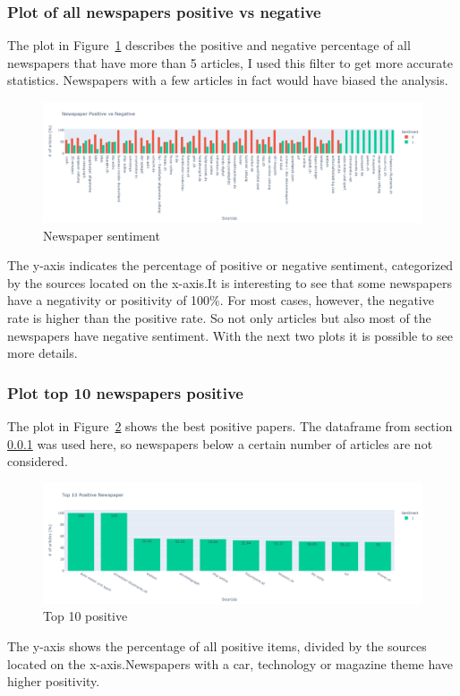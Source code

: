\subsubsection{Plot of all newspapers positive vs negative}
\label{chap:allposneg}
The \gls{plot} in Figure~\ref{fig:fig_all} describes the positive and negative percentage of all newspapers that have more than 5 articles, I used this filter to get more accurate statistics. Newspapers with a few articles in fact would have biased the analysis.
\begin{figure}[H]
\centering
\includegraphics[width=1\textwidth]{images/posvsneg1.png}
\caption{Newspaper sentiment}
\label{fig:fig_all}
\end{figure}
\FloatBarrier
The y-axis indicates the percentage of positive or negative sentiment, categorized by the sources located on the x-axis.It is interesting to see that some newspapers have a negativity or positivity of 100\%.
For most cases, however, the negative rate is higher than the positive rate.
So not only articles but also most of the newspapers have negative sentiment.
With the next two plots it is possible to see more details.

\subsubsection{Plot top 10 newspapers positive}
The \gls{plot} in Figure~\ref{fig:fig_10pos} shows the best positive papers. The dataframe from section \ref{chap:allposneg} was used here, so newspapers below a certain number of articles are not considered.
\begin{figure}[H]
 \includegraphics[width=1.25\textwidth,center]{images/toppos.png}
\caption{Top 10 positive}
\label{fig:fig_10pos}
\end{figure}
\FloatBarrier
The y-axis shows the percentage of all positive items, divided by the sources located on the x-axis.Newspapers with a car, technology or magazine theme have higher positivity.


